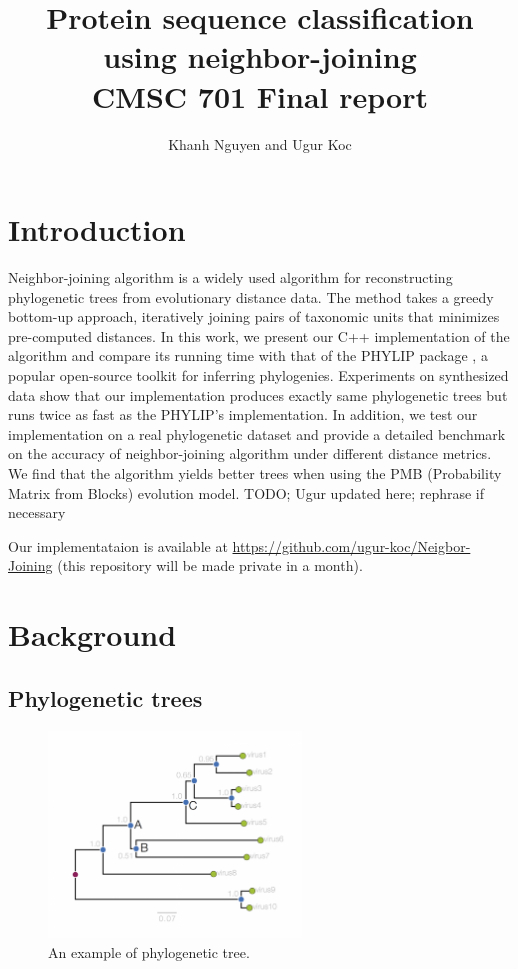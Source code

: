 \documentclass[11pt,letterpaper]{article}
\title{
Protein sequence classification using neighbor-joining\\
   CMSC 701 Final report
}
\author{
	Khanh Nguyen and Ugur Koc
}
\theoremstyle{definition}
\begin{document}
\maketitle

\section{Introduction}

Neighbor-joining algorithm \cite{saitou1987neighbor} is a widely used algorithm for reconstructing phylogenetic trees from evolutionary distance data. The method takes a greedy bottom-up approach, iteratively joining pairs of taxonomic units that minimizes pre-computed distances. In this work, we present our C++ implementation of the algorithm and compare its running time with that of the PHYLIP package \cite{felsenstein2005phylip}, a popular open-source toolkit for inferring phylogenies. Experiments on synthesized data show that our implementation produces exactly same phylogenetic trees but runs twice as fast as the PHYLIP's implementation.  In addition, we test our implementation on a real phylogenetic dataset and provide a detailed benchmark on the accuracy of neighbor-joining algorithm under different distance metrics. We find that the algorithm yields better trees when using the PMB (Probability Matrix from Blocks) evolution model. TODO; Ugur updated here; rephrase if necessary

Our implementataion is available at \url{https://github.com/ugur-koc/Neigbor-Joining} (this repository will be made private in a month).

\section{Background}


\subsection{Phylogenetic trees}

\begin{figure}[t]
  \centering
  \includegraphics[width=0.6\textwidth]{phylogram_1a.png}
  \caption{An example of phylogenetic tree.}
  \label{fig:phytree}
\end{figure}
\end{document}
